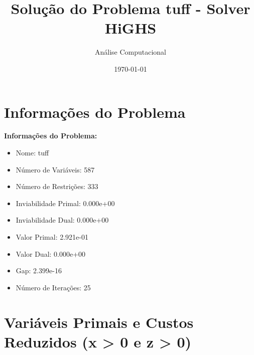 \documentclass[12pt]{article}
\title{Solução do Problema tuff - Solver HiGHS}
\author{Análise Computacional}
\date{\today}
\begin{document}
\maketitle

\section{Informações do Problema}

\textbf{Informações do Problema:}
\begin{itemize}
\item Nome: tuff
\item Número de Variáveis: 587
\item Número de Restrições: 333
\item Inviabilidade Primal: 0.000e+00
\item Inviabilidade Dual: 0.000e+00
\item Valor Primal: 2.921e-01
\item Valor Dual: 0.000e+00
\item Gap: 2.399e-16
\item Número de Iterações: 25
\end{itemize}


\section{Variáveis Primais e Custos Reduzidos (x > 0 e z > 0)}
\end{document}
